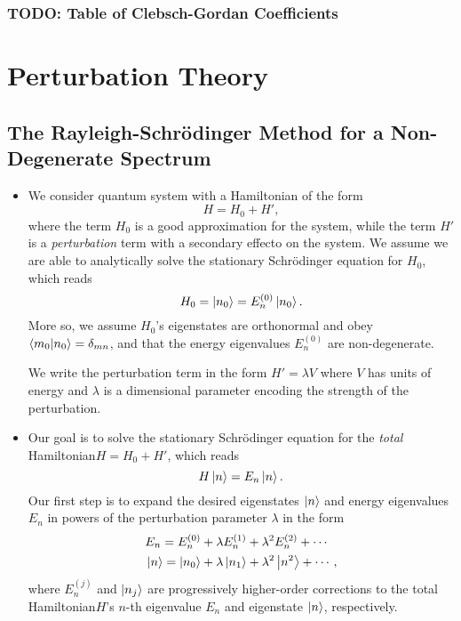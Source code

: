 \documentclass[11pt, a4paper]{article}
\newcommand{\Schro}{Schr\"{o}dinger\xspace}
\newcommand{\Ham}{Hamiltonian\xspace}
\begin{document}
\subsubsection{TODO: Table of Clebsch-Gordan Coefficients}

\section{Perturbation Theory}

\subsection{The Rayleigh-\Schro Method for a Non-Degenerate Spectrum}
\begin{itemize}
    \item We consider quantum system with a \Ham of the form 
    \begin{equation*}
        H = H_{0} + H',
    \end{equation*}
    where the term $ H_{0} $ is a good approximation for the system, while the term $ H' $ is a \textit{perturbation} term with a secondary effecto on the system. We assume we are able to analytically solve the stationary \Schro equation for $ H_{0} $, which reads
    \begin{equation*}
        H_{0} = \ket{n_{0}} = E_{n}^{(0)} \ket{n_{0}}.
    \end{equation*}
    More so, we assume $ H_{0} $'s eigenstates are orthonormal and obey $ \braket{m_{0}}{n_{0}} = \delta_{mn} $, and that the energy eigenvalues $ E_{n}^{(0)} $ are non-degenerate. 

    We write the perturbation term in the form $ H' = \lambda V $ where $ V $ has units of energy and $ \lambda $ is a dimensional parameter encoding the strength of the perturbation. 

    \item Our goal is to solve the stationary \Schro equation for the \textit{total} \Ham $ H = H_{0} + H' $, which reads
    \begin{equation*}
        H \ket{n} = E_{n}\ket{n}.
    \end{equation*}
    Our first step is to expand the desired eigenstates $ \ket{n} $ and energy eigenvalues $ E_{n} $ in powers of the perturbation parameter $ \lambda $ in the form
    \begin{align*}
        &E_{n} = E_{n}^{(0)} + \lambda E_{n}^{(1)} + \lambda^{2} E_{n}^{(2)} + \cdots\\
        &\ket{n} = \ket{n_{0}} + \lambda \ket{n_{1}} + \lambda^{2} \ket{n^{2}} + \cdots,
    \end{align*}
    where $ E_{n}^{(j)} $ and $ \ket{n_{j}} $ are progressively higher-order corrections to the total \Ham $ H $'s $ n $-th eigenvalue $ E_{n} $ and eigenstate $ \ket{n} $, respectively.


\end{itemize}
\end{document}
